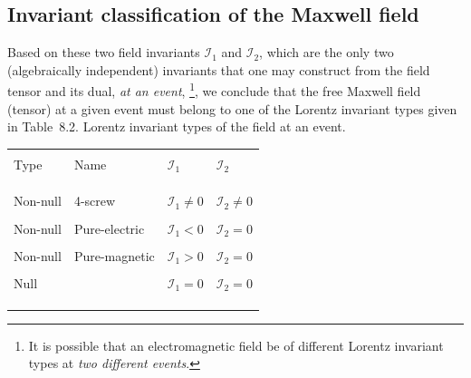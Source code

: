 \subsection{Invariant classification of the Maxwell field}
Based on these two field invariants $\mathcal{I}_1$ and 
$\mathcal{I}_2$, which are the {only two} (algebraically 
independent) invariants that one may construct from the 
field tensor and its dual,  \textsl{at an event}, 
\footnote{It is possible that an electromagnetic 
field be of different Lorentz invariant types at 
\textsl{two different events}.}, we conclude that {the free 
Maxwell field (tensor) at a given event must belong to one 
of the Lorentz invariant types given in Table~8.2}. 
{}Lorentz invariant types of the field at an 
event.
\begin{center}
\begin{tabular}{llll}\hline\\
Type &Name & $\mathcal{I}_1$ & $\mathcal{I}_2$
\\\\ \hline\\\\
Non-null&4-screw & $\mathcal{I}_1\neq 0$
& $\mathcal{I}_2\neq 0$\\\\
Non-null&Pure-electric &$\mathcal{I}_1<0$
& $\mathcal{I}_2=0$\\\\
Non-null&Pure-magnetic & $\mathcal{I}_1>0$
& $\mathcal{I}_2=0$ \\\\
Null& &$\mathcal{I}_1 =0$
& $\mathcal{I}_2=0$\\\\\hline\\\\
\end{tabular}
\end{center}

